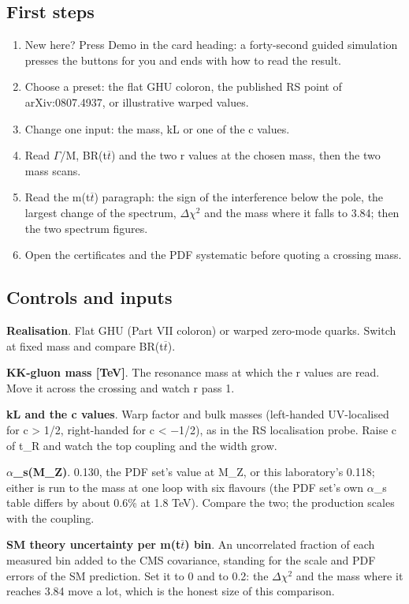 \documentclass[11pt,a4paper]{article}
\begin{document}
\subsection*{First steps}
\begin{enumerate}
\item New here? Press  Demo in the card heading: a forty-second guided simulation presses the buttons for you and ends with how to read the result.
\item Choose a preset: the flat GHU coloron, the published RS point of arXiv:0807.4937, or illustrative warped values.
\item Change one input: the mass, kL or one of the c values.
\item Read \ensuremath{\Gamma}/M, BR(t\ensuremath{\overline{t}}) and the two r values at the chosen mass, then the two mass scans.
\item Read the m(t\ensuremath{\overline{t}}) paragraph: the sign of the interference below the pole, the largest change of the spectrum, \ensuremath{\Delta}\ensuremath{\chi}\ensuremath{{}^{2}} and the mass where it falls to 3.84; then the two spectrum figures.
\item Open the certificates and the PDF systematic before quoting a crossing mass.
\end{enumerate}
\subsection*{Controls and inputs}
\textbf{Realisation}. Flat GHU (Part VII coloron) or warped zero-mode quarks. Switch at fixed mass and compare BR(t\ensuremath{\overline{t}}).

\textbf{KK-gluon mass [TeV]}. The resonance mass at which the r values are read. Move it across the crossing and watch r pass 1.

\textbf{kL and the c values}. Warp factor and bulk masses (left-handed UV-localised for c > 1/2, right-handed for c < \ensuremath{-}1/2), as in the RS localisation probe. Raise c of t\_R and watch the top coupling and the width grow.

\textbf{\ensuremath{\alpha}\_s(M\_Z)}. 0.130, the PDF set's value at M\_Z, or this laboratory's 0.118; either is run to the mass at one loop with six flavours (the PDF set's own \ensuremath{\alpha}\_s table differs by about 0.6\% at 1.8 TeV). Compare the two; the production scales with the coupling.

\textbf{SM theory uncertainty per m(t\ensuremath{\overline{t}}) bin}. An uncorrelated fraction of each measured bin added to the CMS covariance, standing for the scale and PDF errors of the SM prediction. Set it to 0 and to 0.2: the \ensuremath{\Delta}\ensuremath{\chi}\ensuremath{{}^{2}} and the mass where it reaches 3.84 move a lot, which is the honest size of this comparison.
\end{document}

